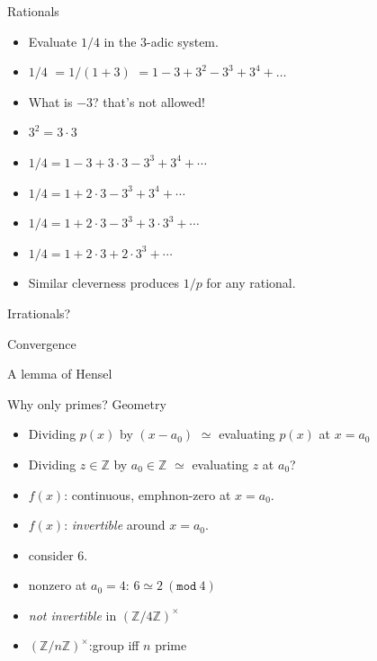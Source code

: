 \documentclass[8pt]{beamer}
\renewcommand{\mod}[1]{\left( \texttt{mod}~#1 \right)}
\begin{document}
\begin{frame}{Rationals}
\begin{itemize}
\item Evaluate $1/4$ in the $3$-adic system. \pause
\item $1/4$ \pause $ = 1/(1+3)$ \pause $ = 1 - 3 + 3^2 - 3^3 + 3^4 + \dots$\pause
\item What is $-3$? that's not allowed! \pause
\item $3^2 = 3 \cdot 3$ \pause
\item $1/4 = 1 - 3 + 3\cdot 3 - 3^3 + 3^4 + \cdots$ \pause
\item $1/4 = 1  + 2\cdot 3 - 3^3 + 3^4 + \cdots$ \pause
\item $1/4 = 1  + 2\cdot 3 - 3^3 + 3\cdot 3^3 + \cdots$ \pause
\item $1/4 = 1  + 2\cdot 3 + 2\cdot 3^3 + \cdots$ \pause
\item Similar cleverness produces $1/p$ for any rational. \pause
\end{itemize}
\end{frame}


\begin{frame}{Irrationals?}
\end{frame}


\begin{frame}{Convergence}
\end{frame}

\begin{frame}{A lemma of Hensel}
\end{frame}

\begin{frame}[fragile]{Why only primes? Geometry}
\begin{itemize}
\item Dividing $p(x)$ by $(x-a_0)$ $\simeq$ evaluating  $p(x)$ at $x = a_0$ \pause
\item Dividing $z \in \mathbb Z$ by $a_0 \in \mathbb Z$ $\simeq$ evaluating $z$ at $a_0$? \pause
\item $f(x)$: continuous, emph{non-zero} at $x = a_0$. \pause
\item $f(x)$: \emph{invertible} around $x = a_0$. \pause
\item consider $6$. \pause
\item nonzero at $a_0 = 4$: $6 \simeq 2~\mod{4}$\pause
\item \emph{not invertible} in $(\mathbb{Z}/4\mathbb{Z})^\times$ \pause
\item $(\mathbb{Z}/n\mathbb{Z})^\times$:group iff $n$ prime
\end{itemize}

\end{frame}
\end{document}
